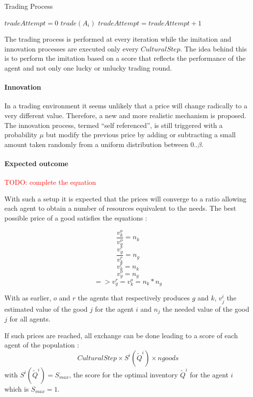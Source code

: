 \documentclass{wscpaperproc}
\newcommand{\memo}[2]{\textcolor{#1}{#2}}
\newcommand{\todo}[1]{\memo{red}{TODO: #1\\}}
\begin{document}
\begin{algorithm}
\caption{Trading Process}
\label{algo:trade}
	\begin{algorithmic}[1]
	\scriptsize
			\State $tradeAttempt = 0$
					\State $trade(A_i)$
				\Else
					\State $tradeAttempt = tradeAttempt + 1$					
				\EndIf
			\EndFor
		\EndFor
\end{algorithmic}
\end{algorithm}

The trading process is performed at every iteration while the imitation and innovation processes are executed only every $CulturalStep$. The idea behind this is to perform the imitation based on a score that reflects the performance of the agent and not only one lucky or unlucky trading round.

\paragraph{Innovation} In a trading environment it seems unlikely that a price will change radically to a very different value. Therefore, a new and more realistic mechanism is proposed. The innovation process, termed ``self referenced'', is still triggered with a probability $\mu$ 
but modify the previous price by adding or subtracting a small amount taken randomly from a uniform  distribution between $0 .. \beta$.


\paragraph{Expected outcome} 

\todo{complete the equation}

With such a setup it is expected that the prices will converge to a ratio allowing each agent to obtain a number of resources equivalent to the needs. The best possible price of a good satisfies the equations :

$$\frac{v^o_k}{v^o_g} = n_k $$
$$\frac{v^r_g}{v^r_k} = n_g $$
$$v^r_k = n_k $$
$$v^o_g = n_g $$
$$=>v^r_g = v^o_k = n_k * n_g$$

With as earlier, $o$ and $r$ the agents that respectively produces $g$ and $k$, $v_j^i$ the estimated value of the good $j$ for the agent $i$ and $n_j$ the needed value of the good $j$ for all agents.

If such prices are reached, all exchange can be done leading to a score of each agent of the population : $$ CulturalStep\times S^i(\tilde{Q}^i) \times ngoods $$ with $S^i(\tilde{Q}^i) = S_{max}$, the score for the optimal inventory $\tilde{Q}^i$ for the agent $i$ which is $S_{max}=1$.
\end{document}
